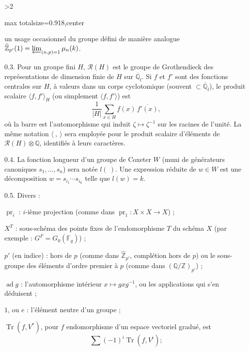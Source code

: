 \documentclass[9pt,twoside]{extarticle}
\newcommand{\EditionPage}[3]{%
  \ifnum#1>2\clearpage\fi
  \pdfbookmark[1]{Printed page #2}{fr-folio-#2}%
  \hypertarget{fr-physical-#1}{}%
  \noindent\begin{adjustbox}{max totalsize={\textwidth}{0.918\textheight},center}
  \begin{minipage}[t]{\textwidth}
  \fontsize{9.4}{11.1}\selectfont\justifying
  #3
  \end{minipage}
  \end{adjustbox}%
}
\begin{document}
\EditionPage{4}{105}{%
un usage occasionnel du groupe défini de manière analogue \(\widehat{\mathbb{Z}}_{p'}(1)=\varprojlim_{(n,p)=1}\mu_n(k)\).\par

0.3. Pour un groupe fini \(H\), \(\mathcal{R}(H)\) est le groupe de Grothendieck des représentations de dimension finie de \(H\) sur \(\overline{\mathbb{Q}}_l\). Si \(f\) et \(f'\) sont des fonctions centrales sur \(H\), à valeurs dans un corps cyclotomique (souvent \(\subset\overline{\mathbb{Q}}_l\)), le produit scalaire \(\langle f,f'\rangle_H\) (ou simplement \(\langle f,f'\rangle\)) est \[
\frac{1}{|H|}\sum_{x\in H} f(x)\,\overline{f'(x)},
\] où la barre est l'automorphisme qui induit \(\zeta\mapsto\zeta^{-1}\) sur les racines de l'unité. La même notation \(\langle\ ,\ \rangle\) sera employée pour le produit scalaire d'éléments de \(\mathcal{R}(H)\otimes\mathbb{Q}\), identifiés à leurs caractères.\par

0.4. La fonction longueur d'un groupe de Coxeter \(W\) (muni de générateurs canoniques \(s_1,\ldots,s_n\)) sera notée \(l(\ )\). Une expression réduite de \(w\in W\) est une décomposition \(w=s_{i_1}\cdots s_{i_k}\) telle que \(l(w)=k\).\par

0.5. Divers :\par

\(\operatorname{pr}_i\) : \(i\)-ième projection (comme dans \(\operatorname{pr}_1:X\times X\to X\)) ;\par

\(X^T\) : sous-schéma des points fixes de l'endomorphisme \(T\) du schéma \(X\) (par exemple : \(G^F=G_0(\mathbb{F}_q)\)) ;\par

\(p'\) (en indice) : hors de \(p\) (comme dans \(\widehat{\mathbb{Z}}_{p'}\), complétion hors de \(p\)) ou le sous-groupe des éléments d'ordre premier à \(p\) (comme dans \((\mathbb{Q}/\mathbb{Z})_{p'}\)) ;\par

\(\operatorname{ad}g\) : l'automorphisme intérieur \(x\mapsto gxg^{-1}\), ou les applications qui s'en déduisent ;\par

\(1\), ou \(e\) : l'élément neutre d'un groupe ;\par

\(\operatorname{Tr}(f,V^*)\), pour \(f\) endomorphisme d'un espace vectoriel gradué, est \[
\sum(-1)^i\operatorname{Tr}(f,V^i) ;
\]\par

}
\end{document}

